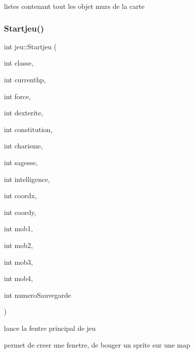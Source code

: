 listes contenant tout les objet murs de la carte \mbox{\label{classjeu_aeb59c51913d23e2f449ad04f0de2072b}} 
\subsubsection{\texorpdfstring{Startjeu()}{Startjeu()}}
{\footnotesize\ttfamily int jeu\+::\+Startjeu (\begin{DoxyParamCaption}\item[{int}]{classe,  }\item[{int}]{currenthp,  }\item[{int}]{force,  }\item[{int}]{dexterite,  }\item[{int}]{constitution,  }\item[{int}]{charisme,  }\item[{int}]{sagesse,  }\item[{int}]{intelligence,  }\item[{int}]{coordx,  }\item[{int}]{coordy,  }\item[{int}]{mob1,  }\item[{int}]{mob2,  }\item[{int}]{mob3,  }\item[{int}]{mob4,  }\item[{int}]{numero\+Sauvegarde }\end{DoxyParamCaption})}



lance la fentre principal de jeu 

permet de creer une fenetre, de bouger un sprite sur une map


